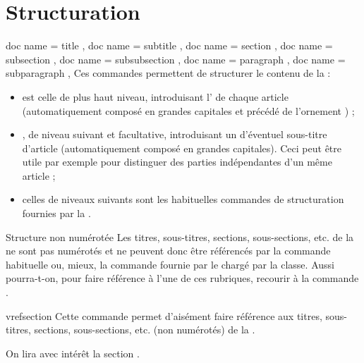 \documentclass{letgut}
\begin{document}
\section{Structuration}
\label{sec:structuration}

\begin{docCommands}[
  doc parameter = \oarg{intitulé alternatif}\marg{intitulé}
  ]
  {
    { doc name = title },
    { doc name = subtitle },
    { doc name = section },
    { doc name = subsection },
    { doc name = subsubsection },
    { doc name = paragraph },
    { doc name = subparagraph },
  }
  Ces commandes permettent de structurer le contenu de la  :
  \begin{itemize}
  \item {} est celle de plus haut niveau, introduisant
    l' de chaque article (automatiquement composé en grandes
    capitales et précédé de l'ornement \aldineleft) ;
  \item {}, de niveau suivant et facultative, introduisant un
     d'éventuel sous-titre d'article (automatiquement composé en
    grandes capitales). Ceci peut être utile par exemple pour distinguer des
    parties indépendantes d'un même article ;
  \item celles de niveaux suivants sont les habituelles commandes de
    structuration fournies par la .
  \end{itemize}
\end{docCommands}

\begin{dbremark}{Structure non numérotée}{}
  Les titres, sous-titres, sections, sous-sections, etc. de la  ne sont
  pas numérotés et ne peuvent donc être référencés par la commande habituelle
   ou, mieux, la commande  fournie par le
   chargé par la classe. Aussi pourra-t-on, pour faire
  référence à l'une de ces rubriques, recourir à la commande
  .
\end{dbremark}

\begin{docCommand}{vrefsection}{}
  Cette commande permet d'aisément faire référence aux titres, sous-titres,
  sections, sous-sections, etc. (non numérotés) de la .
\end{docCommand}

\begin{ltx-code-result}[title addon=références croisées aux rubriques,listing options app={deletekeywords={[3]{section}}}]
On lira avec intérêt la section .
\end{ltx-code-result}
\end{document}
